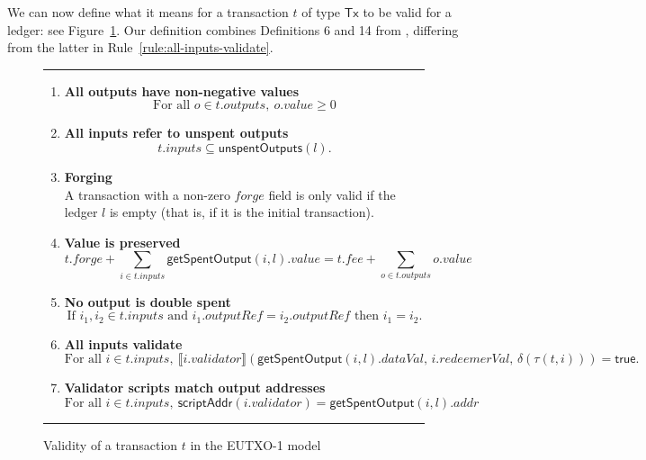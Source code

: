 \documentclass[a4paper]{article}
\newcommand{\todokwxm}[1]{\todo[inline,color=blue!20,author=kwxm]{#1}}
\newcommand{\msf}[1]{\ensuremath{\mathsf{#1}}}
\newcommand{\mi}[1]{\ensuremath{\mathit{#1}}}
\newcommand\rfskip{7pt}
\newenvironment{ruledfigure}[1]{\begin{figure}[#1]\hrule\vspace{\rfskip}}{\vspace{\rfskip}\hrule\end{figure}}
\newcommand{\true}{\textsf{true}}
\newcommand{\scriptAddr}{\msf{scriptAddr}}
\newcommand{\inputs}{\mi{inputs}}
\newcommand{\outputs}{\mi{outputs}}
\newcommand{\forge}{\mi{forge}}
\newcommand{\fee}{\mi{fee}}
\newcommand{\addr}{\mi{addr}}
\newcommand{\val}{\mi{value}}  %
\newcommand{\validator}{\mi{validator}}
\newcommand{\redeemerval}{\mi{redeemerVal}}
\newcommand{\dataval}{\mi{dataVal}}
\newcommand{\outputref}{\mi{outputRef}}
\newcommand{\getSpent}{\msf{getSpentOutput}}
\newcommand{\unspent}{\msf{unspentOutputs}}
\newcommand{\eutxotx}{\msf{Tx}}
\begin{document}
We can now define what it means for a transaction $t$ of
type $\eutxotx$ to be valid for a ledger: see
Figure~\ref{fig:eutxo-1-validity}.  Our definition combines
Definitions 6 and 14 from \citep{Zahnentferner18-UTxO}, differing from
the latter in Rule~\ref{rule:all-inputs-validate}.
\todokwxm{Check this.}

\begin{ruledfigure}{H}
\begin{enumerate}

\item
  \label{rule:all-outputs-are-non-negative}
  \textbf{All outputs have non-negative values}
  \begin{displaymath}
    \textrm{For all } o \in t.\outputs,\ o.\val \geq 0
  \end{displaymath}

\item
  \label{rule:all-inputs-refer-to-unspent-outputs}
  \textbf{All inputs refer to unspent outputs}
  \begin{displaymath}
    t.\inputs \subseteq \unspent(l).
  \end{displaymath}

\item
  \label{rule:forging}
  \textbf{Forging} \\
    A transaction with a non-zero \forge{}
    field is only valid if the ledger $l$ is empty (that
    is, if it is the initial transaction).

\item
  \label{rule:value-is-preserved}
  \textbf{Value is preserved}
  \begin{displaymath}
    t.\forge + \sum_{i \in t.\inputs} \getSpent(i, l).\val = t.\fee + \sum_{o \in t.\outputs} o.\val
  \end{displaymath}

\item
  \label{rule:no-double-spending}
  \textbf{No output is double spent}
  \begin{displaymath}
    \textrm{If } i_1, i_2 \in t.\inputs \textrm{ and }  i_1.\outputref = i_2.\outputref
    \textrm{ then } i_1 = i_2.
  \end{displaymath}

\item
  \label{rule:all-inputs-validate}
  \textbf{All inputs validate}
  \begin{displaymath}
    \textrm{For all } i \in t.\inputs,\ \llbracket
    i.\validator\rrbracket (\getSpent(i, l).\dataval,\, i.\redeemerval,\,  \delta(\tau(t,i))) = \true.
  \end{displaymath}

\item
  \label{rule:validator-scripts-hash}
  \textbf{Validator scripts match output addresses}
  \begin{displaymath}
    \textrm{For all } i \in t.\inputs,\ \scriptAddr(i.\validator) = \getSpent(i, l).\addr
  \end{displaymath}

\end{enumerate}
\caption{Validity of a transaction $t$ in the EUTXO-1 model}
\label{fig:eutxo-1-validity}
\end{ruledfigure}
\end{document}
